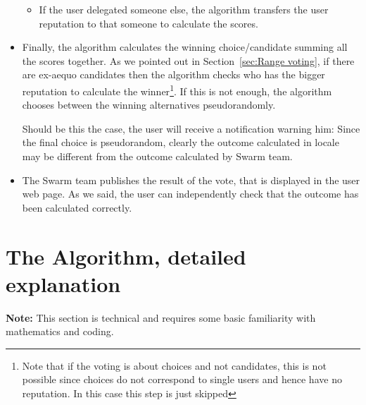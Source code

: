 \documentclass[submission, copyright,creativecommons,sharealike,noncommercial]{eptcs}
\begin{document}
\begin{itemize}
\begin{itemize}
				\item If the user delegated someone else, the algorithm transfers the user reputation to that someone to calculate the scores.
			\end{itemize}
			\item Finally, the algorithm calculates the winning choice/candidate summing all the scores together. As we pointed out in Section~\ref{sec:Range voting}, if there are ex-aequo candidates then the algorithm checks who has the bigger reputation to calculate the winner\footnote{Note that if the voting is about choices and not candidates, this is not possible since choices do not correspond to single users and hence have no reputation. In this case this step is just skipped}. If this is not enough, the algorithm chooses between the winning alternatives pseudorandomly.
			
			Should be this the case, the user will receive a notification warning him: Since the final choice is pseudorandom, clearly the outcome calculated in locale may be different from the outcome calculated by Swarm team.
			
			\item The Swarm team publishes the result of the vote, that is displayed in the user web page. As we said, the user can independently check that the outcome has been calculated correctly.
		\end{itemize}
%
%
\section{The Algorithm, detailed explanation}
%
	\textbf{Note:} This section is technical and requires some basic familiarity with mathematics and coding. 
%
%
\end{document}

